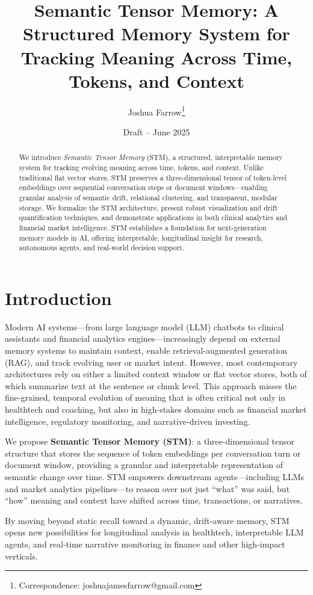 \documentclass[11pt]{article}
\title{\bf Semantic Tensor Memory: A Structured Memory System for Tracking Meaning Across Time, Tokens, and Context}
\author[1]{Joshua Farrow\thanks{Correspondence: joshuajamesfarrow@gmail.com}}
\affil[1]{Independent Researcher, Richmond, VA, USA}
\date{Draft -- June 2025}
\begin{document}
\maketitle

\begin{abstract}
We introduce \emph{Semantic Tensor Memory} (STM), a structured, interpretable memory system for tracking evolving meaning across time, tokens, and context. Unlike traditional flat vector stores, STM preserves a three-dimensional tensor of token-level embeddings over sequential conversation steps or document windows---enabling granular analysis of semantic drift, relational clustering, and transparent, modular storage. We formalize the STM architecture, present robust visualization and drift quantification techniques, and demonstrate applications in both clinical analytics and financial market intelligence. STM establishes a foundation for next-generation memory models in AI, offering interpretable, longitudinal insight for research, autonomous agents, and real-world decision support.
\end{abstract}
    

\section{Introduction}
Modern AI systems---from large language model (LLM) chatbots to clinical assistants and financial analytics engines---increasingly depend on external memory systems to maintain context, enable retrieval-augmented generation (RAG), and track evolving user or market intent. However, most contemporary architectures rely on either a limited context window or flat vector stores, both of which summarize text at the sentence or chunk level. This approach misses the fine-grained, temporal evolution of meaning that is often critical not only in healthtech and coaching, but also in high-stakes domains such as financial market intelligence, regulatory monitoring, and narrative-driven investing.

We propose \textbf{Semantic Tensor Memory (STM)}: a three-dimensional tensor structure that stores the sequence of token embeddings per conversation turn or document window, providing a granular and interpretable representation of semantic change over time. STM empowers downstream agents---including LLMs and market analytics pipelines---to reason over not just ``what'' was said, but ``how'' meaning and context have shifted across time, transactions, or narratives.

By moving beyond static recall toward a dynamic, drift-aware memory, STM opens new possibilities for longitudinal analysis in healthtech, interpretable LLM agents, and real-time narrative monitoring in finance and other high-impact verticals.
\end{document}
